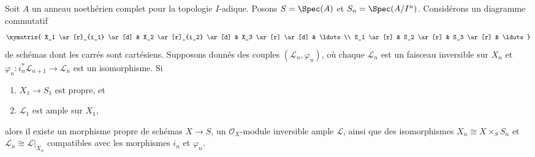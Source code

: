 \begin{theorem}
\label{theorem-algebraization}
Soit $A$ un anneau noethérien complet pour la topologie $I$-adique.
Posons $S = \Spec(A)$ et $S_n = \Spec(A/I^n)$. Considérons un diagramme
commutatif
$$
\xymatrix{
X_1 \ar[r]_{i_1} \ar[d] & X_2 \ar[r]_{i_2} \ar[d] & X_3 \ar[r] \ar[d] &
\ldots \\
S_1 \ar[r] & S_2 \ar[r] & S_3 \ar[r] & \ldots
}
$$
de schémas dont les carrés sont cartésiens. Supposons donnés des couples
$(\mathcal{L}_n, \varphi_n)$, où chaque $\mathcal{L}_n$ est un faisceau
inversible sur $X_n$ et
$\varphi_n : i_n^*\mathcal{L}_{n + 1} \to \mathcal{L}_n$ est un isomorphisme.
Si
\begin{enumerate}
\item $X_1 \to S_1$ est propre, et
\item $\mathcal{L}_1$ est ample sur $X_1$,
\end{enumerate}
alors il existe un morphisme propre de schémas $X \to S$, un
$\mathcal{O}_X$-module inversible ample $\mathcal{L}$, ainsi que des
isomorphismes $X_n \cong X \times_S S_n$ et
$\mathcal{L}_n \cong \mathcal{L}|_{X_n}$ compatibles avec les morphismes
$i_n$ et $\varphi_n$.
\end{theorem}

